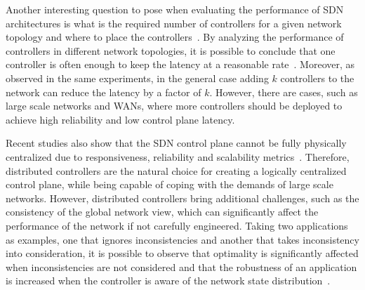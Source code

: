 
Another interesting question to pose when evaluating the performance of SDN architectures is what is the required 
number of controllers for a given network topology and where to place the controllers~\cite{heller2012}. 
By analyzing the performance of controllers in different network topologies, it is possible to conclude that one controller is often enough to keep the latency at a reasonable rate~\cite{heller2012}. 
Moreover, as observed in the same experiments, in the general case adding $k$ controllers to the network can reduce the latency by a factor of $k$. However, there are cases, such as large scale networks and WANs, where more controllers should be deployed to achieve high reliability and low control plane latency. 

Recent studies also show that the SDN control plane cannot be fully physically centralized due to responsiveness, reliability and scalability metrics~\cite{levin2012}. 
Therefore, distributed controllers are the natural choice for creating a logically centralized control plane, while being capable of coping with the demands of large scale networks. 
However, distributed controllers bring additional challenges, such as the consistency of the global network view, which can significantly affect the performance of the network if not carefully engineered. 
Taking two applications as examples, one that ignores inconsistencies and another that takes inconsistency into consideration, it is possible to observe that optimality is significantly affected when inconsistencies are not considered and that the robustness of an application is increased when the controller is aware of the network state distribution~\cite{levin2012}.

